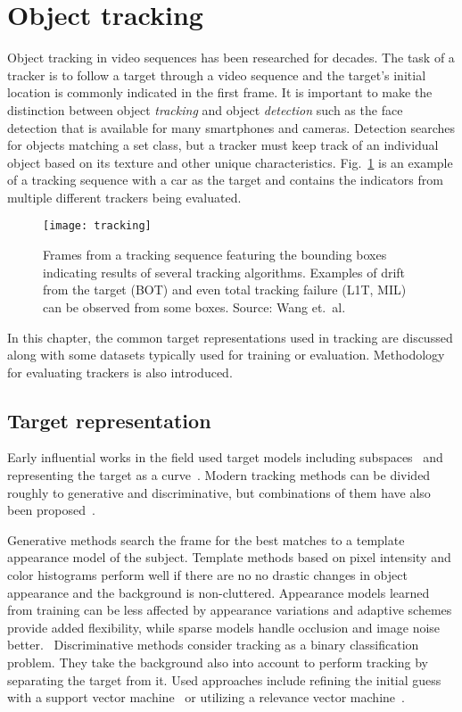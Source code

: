 \section{Object tracking}
Object tracking in video sequences has been researched for decades. The task of a tracker is to follow a target through a video sequence and the target's initial location is commonly indicated in the first frame. It is important to make the distinction between object \textit{tracking} and object \textit{detection} such as the face detection that is available for many smartphones and cameras. Detection searches for objects matching a set class, but a tracker must keep track of an individual object based on its texture and other unique characteristics. Fig.~\ref{fig:tracking} is an example of a tracking sequence with a car as the target and contains the indicators from multiple different trackers being evaluated.

\begin{figure}[H]
\centering
\texttt{[image: tracking]}
\caption{Frames from a tracking sequence featuring the bounding boxes indicating results of several tracking algorithms. Examples of drift from the target (BOT) and even total tracking failure (L1T, MIL) can be observed from some boxes. Source: Wang et.~al.~\cite{OBJECT_PLS}}\label{fig:tracking}
\end{figure}

In this chapter, the common target representations used in tracking are discussed along with some datasets typically used for training or evaluation. Methodology for evaluating trackers is also introduced.

\subsection{Target representation}
Early influential works in the field used target models including subspaces~\cite{EIGENTRACK} and representing the target as a curve~\cite{CONDENSATION}. Modern tracking methods can be divided roughly to generative and discriminative, but combinations of them have also been proposed~\cite{DLT}.

Generative methods search the frame for the best matches to a template appearance model of the subject. Template methods based on pixel intensity and color histograms perform well if there are no no drastic changes in object appearance and the background is non-cluttered. Appearance models learned from training can be less affected by appearance variations and adaptive schemes provide added flexibility, while sparse models handle occlusion and image noise better.~\cite{OBJECT_PLS} Discriminative methods consider tracking as a binary classification problem. They take the background also into account to perform tracking by separating the target from it. Used approaches include refining the initial guess with a support vector machine~\cite{SVT} or utilizing a relevance vector machine~\cite{SPARSE_BAYESIAN}.

